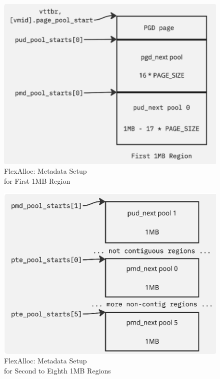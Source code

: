 
\bigskip
\begin{figure}[h!tbp]
\centering
\captionsetup{justification=centering}
\includegraphics{firstmbregion}
\caption{FlexAlloc: Metadata Setup\\for First 1MB Region}
\label{fig:firstmbregion}
\end{figure}

\begin{figure}[h!tbp]
\centering
\captionsetup{justification=centering}
\includegraphics{otherregions}
\caption{FlexAlloc: Metadata Setup\\for Second to Eighth 1MB Regions}
\label{fig:otherregions}
\end{figure}

